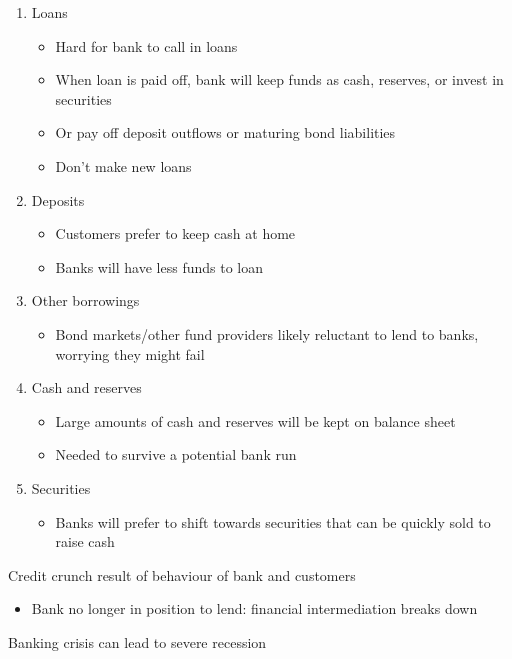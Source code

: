\documentclass{beamer}
\begin{document}
\begin{frame}
  \begin{enumerate}
  \item Loans
  \begin{itemize}
    \item Hard for bank to call in loans
    \item When loan is paid off, bank will keep funds as cash, reserves, or invest in securities
    \item Or pay off deposit outflows or maturing bond liabilities
    \item Don't make new loans
  \end{itemize}
  \item Deposits
  \begin{itemize}
    \item Customers prefer to keep cash at home
    \item Banks will have less funds to loan
  \end{itemize}
  \item Other borrowings
  \begin{itemize}
    \item Bond markets/other fund providers likely reluctant to lend to banks, worrying they might fail    
  \end{itemize}
  \item Cash and reserves
  \begin{itemize}
    \item Large amounts of cash and reserves will be kept on balance sheet
    \item Needed to survive a potential bank run
  \end{itemize}
  \item Securities
  \begin{itemize}
    \item Banks will prefer to shift towards securities that can be quickly sold to raise cash
  \end{itemize}
\end{enumerate} 
\end{frame}

\begin{frame}
  Credit crunch result of behaviour of bank and customers
  \begin{itemize}
    \item Bank no longer in position to lend: financial intermediation breaks down
  \end{itemize}
  \medskip
  Banking crisis can lead to severe recession
\end{frame}
\end{document}
